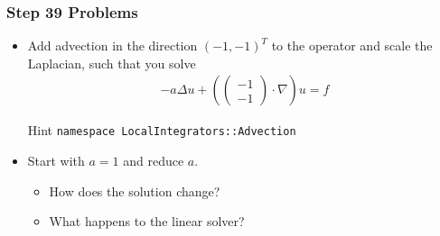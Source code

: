 \begin{frame}
  \frametitle{Step 39 Problems}
  \begin{itemize}
  \item Add advection in the direction $(-1,-1)^T$ to the operator and
    scale the Laplacian, such that you solve
    \begin{gather*}
      -a\Delta u + \left(
      \begin{pmatrix}
        -1\\-1
      \end{pmatrix}
      \cdot \nabla\right) u = f
    \end{gather*}
    \begin{block}{Hint}
      \lstinline!namespace LocalIntegrators::Advection!      
    \end{block}
  \item Start with $a=1$ and reduce $a$.
    \begin{itemize}
    \item How does the solution change?
    \item What happens to the linear solver?
    \end{itemize}
  \end{itemize}
\end{frame}
